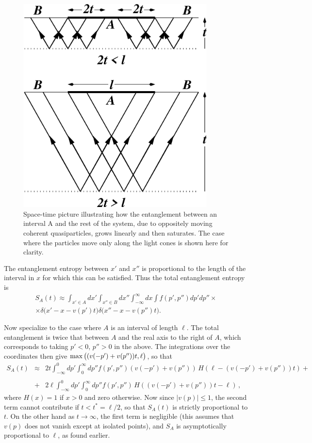 \documentclass[12pt,preprint,tighten,eqsecnum,aps,floats,psfig,epsfig,amsmath,onecolumn]{revtex4-1}
\def\bea{\begin{eqnarray}}
\def\eea{\end{eqnarray}}
\begin{document}
\begin{figure}[t]
\centering
\includegraphics[width=10cm]{2tl.eps}
\caption{\label{fig2tl}
Space-time picture illustrating how the entanglement between
an interval A and the rest of the system,
due to oppositely moving coherent quasiparticles, grows
linearly and then saturates. The case where the particles move only
along the light cones is shown here for clarity.}
\end{figure}
The entanglement entropy between $x'$ and $x''$
is proportional to the length of the interval
in $x$ for which this can be satisfied. Thus the total entanglement
entropy is
\begin{multline}
S_A(t)\approx \int_{x'\in A}dx'\int_{x''\in B}dx''\int_{-\infty}^\infty
dx \int
f(p',p'')dp'dp'' \times \\
\times \delta\big(x'-x-v(p')t\big)\delta 
\big(x''-x-v(p'')t\big).
\end{multline}

Now specialize to the case where $A$ is an interval of length $\ell$.
The total entanglement is twice that
between $A$ and the real axis to the right of $A$, which corresponds to
taking $p'<0$, $p''>0$ in the above. The integrations over the
coordinates then give ${\rm max}\,\big((v(-p')+v(p''))t,\ell\big)$, so
that
\bea
S_A(t)&\approx& 2t\int_{-\infty}^0dp'\int_0^\infty dp''f(p',p'')
(v(-p')+v(p''))\,H(\ell-(v(-p')+v(p''))t)+
\nonumber\\
\nonumber\\&+&
2\ell \int_{-\infty}^0dp'\int_0^\infty dp''f(p',p'')
\,H((v(-p')+v(p''))t-\ell)\,,
\label{ppp}
\eea
where $H(x)=1$ if $x>0$ and zero otherwise. Now since $|v(p)|\leq 1$,
the second term cannot contribute if $t<t^*=\ell/2$, so that $S_A(t)$ is
strictly proportional to $t$. On the other hand as $t\to\infty$, the
first term is negligible (this assumes that $v(p)$ does not vanish
except at isolated points), and $S_A$ is asymptotically proportional to
$\ell$, as found earlier. 
\end{document}
